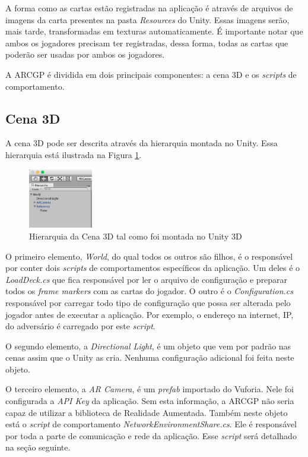 \documentclass[conference]{IEEEtran}
\begin{document}
A forma como as cartas estão registradas na aplicação é através de arquivos de 
imagens da carta presentes na pasta \textit{Resources} do Unity. Essas imagens 
serão, mais tarde, transformadas em texturas automaticamente. É importante notar 
que ambos os jogadores precisam ter registradas, dessa forma, todas as cartas 
que poderão ser usadas por ambos os jogadores.

A ARCGP é dividida em dois principais componentes: a cena 3D e os 
\textit{scripts} de comportamento.

\subsection{Cena 3D}
\label{cena3d}
A cena 3D pode ser descrita através da hierarquia montada no Unity. Essa 
hierarquia está ilustrada na Figura \ref{hierarchy}.

\begin{figure}[t]
	\caption{Hierarquia da Cena 3D tal como foi montada no Unity 3D}
	\label{hierarchy}
	\centering
	\includegraphics[width=0.25\textwidth]{hierarchy}
\end{figure}

O primeiro elemento, \textit{World}, do qual todos os outros são filhos, é o 
responsável por conter dois \textit{scripts} de comportamentos específicos da 
aplicação. Um deles é o \textit{LoadDeck.cs} que fica responsável por ler o 
arquivo de configuração e preparar todos os \textit{frame markers} com as cartas 
do jogador. O outro é o \textit{Configuration.cs} responsável por carregar todo 
tipo de configuração que possa ser alterada pelo jogador antes de executar a 
aplicação. Por exemplo, o endereço na internet, IP, do adversário é carregado 
por este \textit{script}.

O segundo elemento, a \textit{Directional Light}, é um objeto que vem por padrão 
nas cenas assim que o Unity as cria. Nenhuma configuração adicional foi feita 
neste objeto.

O terceiro elemento, a \textit{AR Camera}, é um \textit{prefab} importado do 
Vuforia. Nele foi configurada a \textit{API Key} da aplicação. Sem esta 
informação, a ARCGP não seria capaz de utilizar a biblioteca de Realidade 
Aumentada. Também neste objeto está o \textit{script} de comportamento \textit{
NetworkEnvironmentShare.cs}. Ele é responsável por toda a parte de comunicação 
e rede da aplicação. Esse \textit{script} será detalhado na seção seguinte.
\end{document}
